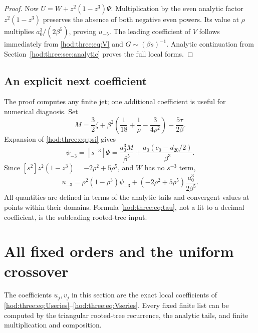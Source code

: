 \documentclass[11pt,letterpaper]{article}
\theoremstyle{definition}\newtheorem{definition}[theorem]{Definition}
\theoremstyle{remark}\newtheorem{remark}[theorem]{Remark}
\begin{document}
\begin{proof}
Now $U=W+z^2(1-z^3)\Psi$. Multiplication by the even analytic factor $z^2(1-z^3)$ preserves the absence of both negative even powers. Its value at $\rho$ multiplies $a_0^3/(2\beta^5)$, proving $u_{-5}$. The leading coefficient of $V$ follows immediately from \eqref{hod:three:eq:V} and $G\sim(\beta s)^{-1}$. Analytic continuation from Section~\ref{hod:three:sec:analytic} proves the full local forms.
\end{proof}

\subsection{An explicit next coefficient}
The proof computes any finite jet; one additional coefficient is useful for numerical diagnosis. Set
\begin{equation}\label{hod:three:eq:M}
M=\frac32\zeta+\beta^2\left(\frac1{18}+\frac1\rho-\frac{3}{4\rho^2}\right)
-\frac{5\tau}{2\beta}.
\end{equation}
Expansion of \eqref{hod:three:eq:psi} gives
\begin{equation}\label{hod:three:eq:psiminus3}
\psi_{-3}=[s^{-3}]\Psi=\frac{a_0^3M}{\beta^5}+
\frac{a_0(c_0-d_{20}/2)}{\beta^3}.
\end{equation}
Since $[s^2]z^2(1-z^3)=-2\rho^2+5\rho^5$, and $W$ has no $s^{-3}$ term,
\begin{equation}\label{hod:three:eq:uminus3}
u_{-3}=\rho^2(1-\rho^3)\psi_{-3}
+(-2\rho^2+5\rho^5)\frac{a_0^3}{2\beta^5}.
\end{equation}
All quantities are defined in terms of the analytic tails and convergent values at points within their domains. Formula \eqref{hod:three:eq:tau}, not a fit to a decimal coefficient, is the subleading rooted-tree input.

\section{All fixed orders and the uniform crossover}\label{hod:three:sec:orders}
The coefficients $u_j,v_j$ in this section are the exact local coefficients of \eqref{hod:three:eq:Useries}--\eqref{hod:three:eq:Vseries}. Every fixed finite list can be computed by the triangular rooted-tree recurrence, the analytic tails, and finite multiplication and composition.
\end{document}
